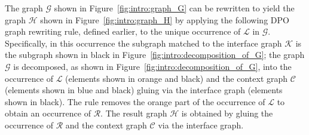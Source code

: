 \noindent The graph $\mathcal{G}$ shown in Figure~\ref{fig:intro:graph_G} can be rewritten to yield the graph $\mathcal{H}$ shown in Figure~\ref{fig:intro:graph_H} by applying the following DPO graph rewriting rule, defined earlier,
to the unique occurrence 
of $\mathcal{L}$ in $\mathcal{G}$.
Specifically, in this occurrence the subgraph matched to the interface graph $\mathcal{K}$ is the subgraph shown in black in Figure~\ref{fig:intro:decomposition_of_G}; the graph $\mathcal{G}$ is decomposed, as shown in Figure~\ref{fig:intro:decomposition_of_G}, into the occurrence of $\mathcal{L}$ (elements shown in orange and black) and the context graph $\mathcal{C}$ (elements shown in blue and black) gluing via the interface graph (elements shown in black).
 The rule removes the orange part of the occurrence of $\mathcal{L}$ to obtain an occurrence of $\mathcal{R}$. 
The result graph $\mathcal{H}$ is obtained by gluing the occurrence of $\mathcal{R}$ and the context graph $\mathcal{C}$ via the interface graph.
